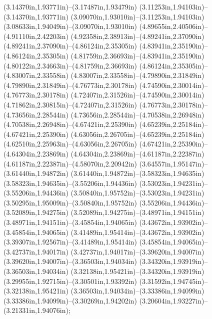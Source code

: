 (3.14370in,1.93771in)--(3.17487in,1.93479in) (3.11253in,1.94103in)--(3.14370in,1.93771in) (3.09070in,1.93010in)--(3.11253in,1.94103in) (3.08633in,1.94049in)--(3.09070in,1.93010in) (4.89655in,2.40506in)--(4.91110in,2.42203in) (4.92358in,2.38913in)--(4.89241in,2.37090in) (4.89241in,2.37090in)--(4.86124in,2.35305in) (4.83941in,2.35190in)--(4.86124in,2.35305in) (4.81759in,2.36693in)--(4.83941in,2.35190in) (4.80122in,2.34663in)--(4.81759in,2.36693in) (4.86124in,2.35305in)--(4.83007in,2.33558in) (4.83007in,2.33558in)--(4.79890in,2.31849in) (4.79890in,2.31849in)--(4.76773in,2.30178in) (4.74590in,2.30014in)--(4.76773in,2.30178in) (4.72407in,2.31526in)--(4.74590in,2.30014in) (4.71862in,2.30815in)--(4.72407in,2.31526in) (4.76773in,2.30178in)--(4.73656in,2.28544in) (4.73656in,2.28544in)--(4.70538in,2.26948in) (4.70538in,2.26948in)--(4.67421in,2.25390in) (4.65239in,2.25184in)--(4.67421in,2.25390in) (4.63056in,2.26705in)--(4.65239in,2.25184in) (4.62510in,2.25963in)--(4.63056in,2.26705in) (4.67421in,2.25390in)--(4.64304in,2.23869in) (4.64304in,2.23869in)--(4.61187in,2.22387in) (4.61187in,2.22387in)--(4.58070in,2.20942in) (3.64557in,1.95147in)--(3.61440in,1.94872in) (3.61440in,1.94872in)--(3.58323in,1.94635in) (3.58323in,1.94635in)--(3.55206in,1.94436in) (3.53023in,1.94231in)--(3.55206in,1.94436in) (3.50840in,1.95752in)--(3.53023in,1.94231in) (3.50295in,1.95009in)--(3.50840in,1.95752in) (3.55206in,1.94436in)--(3.52089in,1.94275in) (3.52089in,1.94275in)--(3.48971in,1.94151in) (3.48971in,1.94151in)--(3.45854in,1.94065in) (3.43672in,1.93902in)--(3.45854in,1.94065in) (3.41489in,1.95414in)--(3.43672in,1.93902in) (3.39307in,1.92567in)--(3.41489in,1.95414in) (3.45854in,1.94065in)--(3.42737in,1.94017in) (3.42737in,1.94017in)--(3.39620in,1.94007in) (3.39620in,1.94007in)--(3.36503in,1.94034in) (3.34320in,1.93919in)--(3.36503in,1.94034in) (3.32138in,1.95421in)--(3.34320in,1.93919in) (3.29955in,1.92715in)--(3.30501in,1.93392in) (3.31592in,1.94745in)--(3.32138in,1.95421in) (3.36503in,1.94034in)--(3.33386in,1.94099in) (3.33386in,1.94099in)--(3.30269in,1.94202in) (3.20604in,1.93227in)--(3.21331in,1.94076in);
